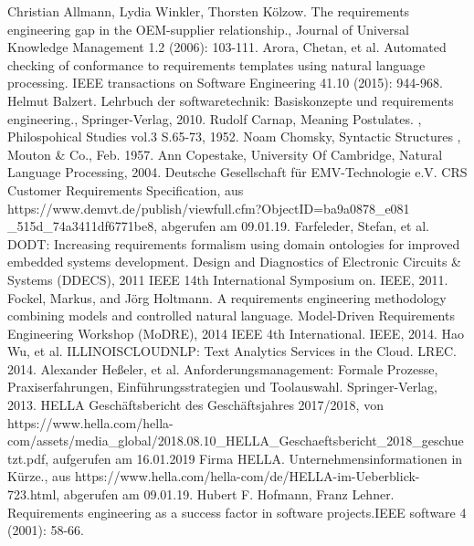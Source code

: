 \documentclass[12pt]{report}
\begin{document}
\newpage
\begin{thebibliography}{20}
 Christian Allmann, Lydia Winkler, Thorsten Kölzow. \glqq The requirements engineering gap in the OEM-supplier relationship.\grqq , Journal of Universal Knowledge Management 1.2 (2006): 103-111.
Arora, Chetan, et al. \glqq Automated checking of conformance to requirements templates using natural language processing.\grqq{} IEEE transactions on Software Engineering 41.10 (2015): 944-968.
Helmut Balzert. \glqq Lehrbuch der softwaretechnik: Basiskonzepte und requirements engineering.\grqq , Springer-Verlag, 2010.
Rudolf Carnap, \glqq  Meaning Postulates.\grqq{} , Philospohical Studies vol.3 S.65-73, 1952.
 Noam Chomsky, \glqq  Syntactic Structures\grqq{} , Mouton \& Co., Feb. 1957.
Ann Copestake, University Of Cambridge, \glqq Natural Language Processing\grqq , 2004.
 Deutsche Gesellschaft für EMV-Technologie e.V. \glqq CRS Customer Requirements Specification\grqq, aus https://www.demvt.de/publish/viewfull.cfm?ObjectID=ba9a0878\_e081\\ \_515d\_74a3411df6771be8, abgerufen am 09.01.19.
 Farfeleder, Stefan, et al. \glqq DODT: Increasing requirements formalism using domain ontologies for improved embedded systems development. \grqq{} Design and Diagnostics of Electronic Circuits \& Systems (DDECS), 2011 IEEE 14th International Symposium on. IEEE, 2011.
 Fockel, Markus, and Jörg Holtmann. \glqq A requirements engineering methodology combining models and controlled natural language.\grqq{} Model-Driven Requirements Engineering Workshop (MoDRE), 2014 IEEE 4th International. IEEE, 2014.
 Hao Wu, et al. \glqq  ILLINOISCLOUDNLP: Text Analytics Services in the Cloud.\grqq{}  LREC. 2014.
 Alexander Heßeler, et al. \glqq Anforderungsmanagement: Formale Prozesse, Praxiserfahrungen, Einführungsstrategien und Toolauswahl.\grqq{} Springer-Verlag, 2013.
 HELLA Geschäftsbericht des Geschäftsjahres 2017/2018, von https://www.hella.com/hella-com/assets/media\_global/2018.08.10\_HELLA\_Geschaeftsbericht\_2018\_geschuetzt.pdf, aufgerufen am 16.01.2019
Firma HELLA. \glqq Unternehmensinformationen in Kürze.\grqq , aus https://www.hella.com/hella-com/de/HELLA-im-Ueberblick-723.html, abgerufen am 09.01.19.
 Hubert F. Hofmann, Franz Lehner. \glqq Requirements engineering as a success factor in software projects.\grqq IEEE software 4 (2001): 58-66.

\end{thebibliography}
\end{document}
